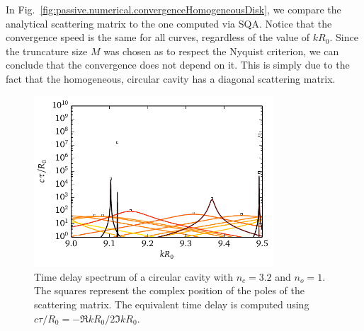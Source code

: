 
In Fig.~\ref{fig:passive.numerical.convergenceHomogeneousDisk}, we compare the analytical scattering
matrix to the one computed via SQA. Notice that the convergence speed is the same for all curves, 
regardless of the value of $kR_0$. Since the truncature size $M$ was chosen as to respect
the Nyquist criterion, we can conclude that the convergence does not depend on it. This is 
simply due to the fact that the homogeneous, circular cavity has a diagonal scattering matrix. 


\begin{figure}
  \centering
  \includegraphics[width=0.8\textwidth]{figs/passive/correspondanceRootsPeaks.pdf}
  \caption[Correspondance between the poles of the scattering matrix and the peaks
	  of the time delay spectrum.]
	  {Time delay spectrum of a circular cavity with $n_c=3.2$ and $n_o=1$. The squares
	  represent the complex position of the poles of the scattering matrix. The equivalent
	  time delay is computed using $c\tau/R_0=-\Re{kR_0}/2\Im{kR_0}$.}
  \label{fig:passive.numerical.correspondanceRoots}
\end{figure}


